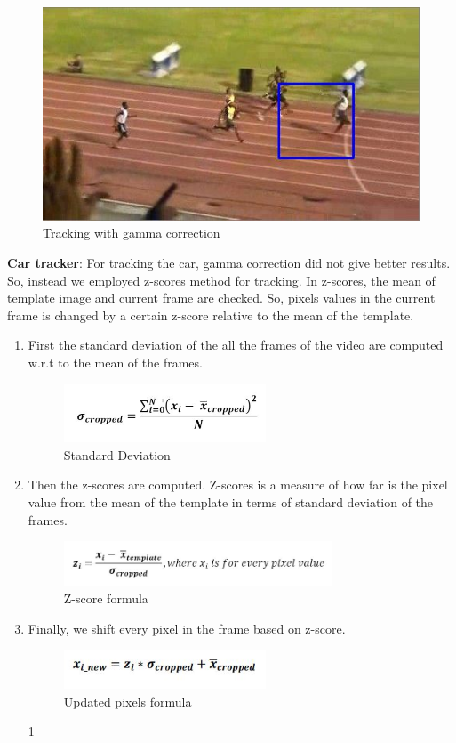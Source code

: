 \documentclass[12pt]{article}
\begin{document}
\begin{figure}[h]
    \centering
    \includegraphics[width=12cm]{boltwithgammaa}
    \caption{Tracking with gamma correction}
    \label{fig:Tracking with gamma correction}
\end{figure}

\textbf{Car tracker}: For tracking the car, gamma correction did not give better results. So, instead we employed z-scores method for tracking. In z-scores, the mean of template image and current frame are checked. So, pixels values in the current frame is changed by a certain z-score relative to the mean of the template. 
\begin{enumerate}
\item First the standard deviation of the all the frames of the video are computed w.r.t to the mean of the frames.
\begin{figure}[h]
    \centering
    \includegraphics[width=6cm]{zscore}
    \caption{Standard Deviation}
    \label{fig:Standard Deviation}
\end{figure}
\newpage
\item Then the z-scores are computed. Z-scores is a measure of how far is the pixel value from the mean of the template in terms of standard deviation of the frames.
\begin{figure}[h]
    \centering
    \includegraphics[width=8cm]{zscore1}
    \caption{Z-score formula}
    \label{fig:Z- score formula}
\end{figure}
\item Finally, we shift every pixel in the frame based on z-score.
\begin{figure}[h]
    \centering
    \includegraphics[width=6cm]{zscore2}
    \caption{Updated pixels formula}
    \label{fig:Updated pixels formula}
\end{figure}1
\end{enumerate}
\end{document}
